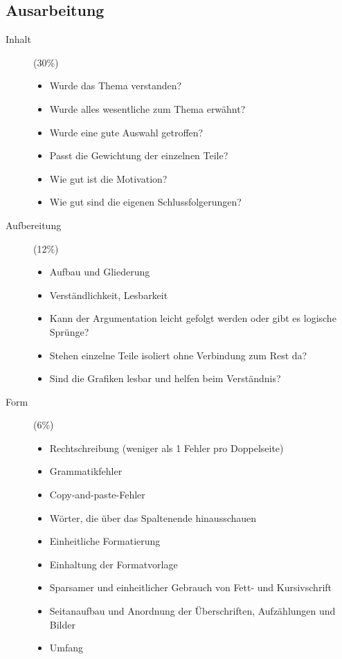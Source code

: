 \documentclass[final,bibliography=totocnumbered]{include/sikseminar}
\begin{document}
\subsection{Ausarbeitung}
\begin{description}
  \item[Inhalt] (30\%)
    \begin{itemize}
      \item Wurde das Thema verstanden?
      \item Wurde alles wesentliche zum Thema erwähnt?
      \item Wurde eine gute Auswahl getroffen?
      \item Passt die Gewichtung der einzelnen Teile?
      \item Wie gut ist die Motivation?
      \item Wie gut sind die eigenen Schlussfolgerungen?
    \end{itemize}
  \item[Aufbereitung] (12\%)
    \begin{itemize}
      \item Aufbau und Gliederung
      \item Verständlichkeit, Lesbarkeit
      \item Kann der Argumentation leicht gefolgt werden oder gibt es logische Sprünge?
      \item Stehen einzelne Teile isoliert ohne Verbindung zum Rest da?
      \item Sind die Grafiken lesbar und helfen beim Verständnis?
    \end{itemize}
  \item[Form] (6\%)
    \begin{itemize}
      \item Rechtschreibung (weniger als 1 Fehler pro Doppelseite)
      \item Grammatikfehler
      \item Copy-and-paste-Fehler
      \item Wörter, die über das Spaltenende hinausschauen
      \item Einheitliche Formatierung
      \item Einhaltung der Formatvorlage
      \item Sparsamer und einheitlicher Gebrauch von Fett- und Kursivschrift
      \item Seitanaufbau und Anordnung der Überschriften, Aufzählungen und Bilder
      \item Umfang
    \end{itemize}
\end{description}
\end{document}
